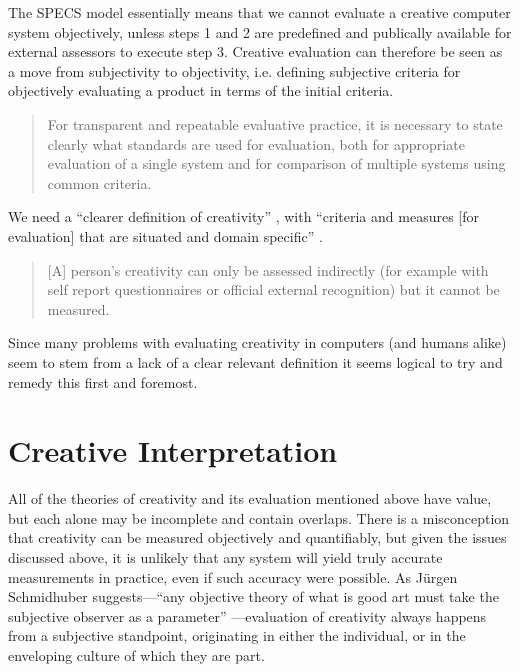 The \ac{SPECS} model essentially means that we cannot evaluate a creative computer system objectively, unless steps \num{1} and \num{2} are predefined and publically available for external assessors to execute step \num{3}. Creative evaluation can therefore be seen as a move from subjectivity to objectivity, i.e. defining subjective criteria for objectively evaluating a product in terms of the initial criteria.

\begin{quotation}
  For transparent and repeatable evaluative practice, it is necessary to state clearly what standards are used for evaluation, both for appropriate evaluation of a single system and for comparison of multiple systems using common criteria. 
\end{quotation}

We need a ``clearer definition of creativity'' \autocite[p.459]{Mayer1999}, with ``criteria and measures [for evaluation] that are situated and domain specific'' \autocite[p.7]{Candy2012}.

\begin{quotation}
  [A] person's creativity can only be assessed indirectly (for example with self report questionnaires or official external recognition) but it cannot be measured. 
\end{quotation}

Since many problems with evaluating creativity in computers (and humans alike) seem to stem from a lack of a clear relevant definition it seems logical to try and remedy this first and foremost.


\section{Creative Interpretation}

All of the theories of creativity and its evaluation mentioned above have value, but each alone may be incomplete and contain overlaps. There is a misconception that creativity can be measured objectively and quantifiably, but given the issues discussed above, it is unlikely that any system will yield truly accurate measurements in practice, even if such accuracy were possible. As J{\"u}rgen Schmidhuber suggests---``any objective theory of what is good art must take the subjective observer as a parameter'' \autocite*{Schmidhuber2006}---evaluation of creativity always happens from a subjective standpoint, originating in either the individual, or in the enveloping culture of which they are part.

